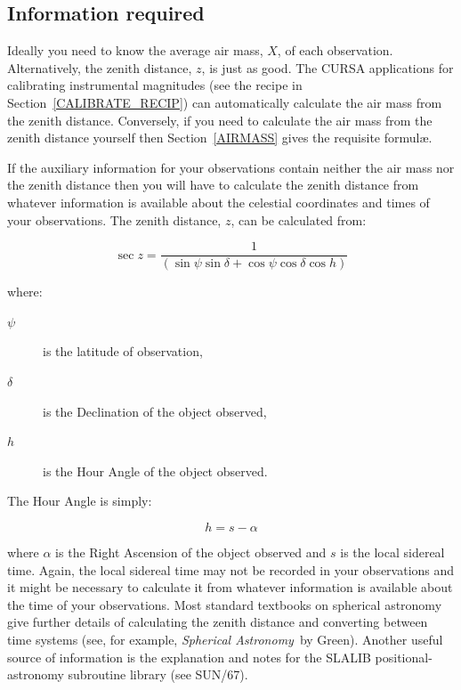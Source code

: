 \documentclass[twoside,11pt]{article}
\newcommand{\xref}[3]{#1}
\begin{document}
\subsection{Information required}

Ideally you need to know the average air mass, $X$, of each observation.
Alternatively, the zenith distance, $z$, is just as good.  The CURSA
applications for calibrating instrumental magnitudes (see the recipe in
Section~\ref{CALIBRATE_RECIP}) can automatically calculate the air mass
from the zenith distance.  Conversely, if you need to calculate the air
mass from the zenith distance yourself then Section~\ref{AIRMASS} gives
the requisite formul\ae.

If the auxiliary information for your observations contain neither the
air mass nor the zenith distance then you will have to calculate the
zenith distance from whatever information is available about the
celestial coordinates and times of your observations.  The zenith
distance, $z$, can be calculated from:

\begin{equation}
\sec z = \frac{1}{(\sin \psi \sin \delta + \cos \psi \cos \delta \cos
h)}
\end{equation}

where:

\begin{description}

  \item[$\psi$] is the latitude of observation,

  \item[$\delta$] is the Declination of the object observed,

  \item[$h$] is the Hour Angle of the object observed.

\end{description}

The Hour Angle is simply:

\begin{equation}
h = s - \alpha
\end{equation}

where $\alpha$ is the Right Ascension of the object observed and $s$
is the local sidereal time.  Again, the local sidereal time may not
be recorded in your observations and it might be necessary to calculate
it from whatever information is available about the time of your
observations.  Most standard textbooks on spherical astronomy give
further details of calculating the zenith distance and converting
between time systems (see, for example, {\it Spherical Astronomy}\, by
Green\cite{GREEN85}).  Another useful source of information is the
explanation and notes for the SLALIB positional-astronomy subroutine
library (see \xref{SUN/67}{sun67}{}\cite{SUN67}).
\end{document}
